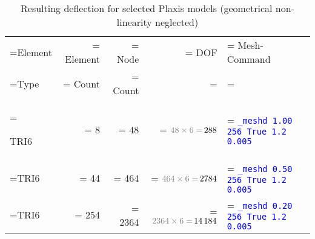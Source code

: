 \begin{table}[htbp]
    \centering
    \caption{Resulting deflection for selected Plaxis models (geometrical non-linearity neglected)}
    \label{bended-plate:tab:plaxis-meshd}
    \begin{tabularx}{\textwidth}{
            >{\hsize\linewidth=\hsize}X
            >{\hsize\linewidth=\hsize}R
            >{\hsize\linewidth=\hsize}R
            >{\hsize\linewidth=\hsize}R
            >{\hsize\linewidth=\hsize}Y}

        \hline


        Element                         & Element                                             & Node           & DOF                                        & Mesh-Command \\

        Type                            & Count                                               & Count          &                                            &              \\

        \hline

        TRI6                            & \qty{8}{}                                           & \qty{ 48}{}    & $ \textcolor{gray}{\qty{ 48}{} \times 6 =
        }\,\qty{ 288}{} $               & {\texttt{\textcolor{blue}{\_meshd 1.00 256 True 1.2
        0.005}}}                                                                                                                                                           \\

        TRI6                            & \qty{44}{}                                          & \qty{ 464}{}   & $ \textcolor{gray}{\qty{ 464}{} \times 6 =
        }\,\qty{ 2784}{} $              & {\texttt{\textcolor{blue}{\_meshd 0.50 256 True 1.2
        0.005}}}                                                                                                                                                           \\

        TRI6                            & \qty{254}{}                                         & \qty{ 2364}{}  & $ \textcolor{gray}{\qty{ 2364}{} \times 6
        = }\,\qty{ 14184}{} $           & {\texttt{\textcolor{blue}{\_meshd 0.20 256 True 1.2
        0.005}}}                                                                                                                                                           \\


\end{tabularx}
\end{table}
